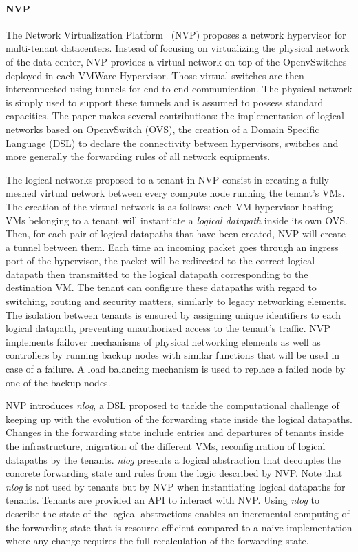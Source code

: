 \paragraph{NVP}
The Network Virtualization Platform~\cite{NVP-Koponen2014} (NVP) proposes a network hypervisor for multi-tenant datacenters. Instead of focusing on virtualizing the physical network of the data center, NVP provides a virtual network on top of the OpenvSwitches~\cite{openvswitch} deployed in each VMWare Hypervisor. Those virtual switches are then interconnected using tunnels for end-to-end communication. 
The physical network is simply used to support these tunnels and is assumed to possess standard capacities.
The paper makes several contributions: the implementation of logical networks based on OpenvSwitch (OVS), the creation of a Domain Specific Language (DSL) to declare the connectivity between hypervisors, switches and more generally the forwarding rules of all network equipments.

The logical networks proposed to a tenant in NVP consist in creating a fully meshed virtual network between every compute node running the tenant's VMs.
The creation of the virtual network is as follows:
each VM hypervisor hosting VMs belonging to a tenant will instantiate a \textit{logical datapath} inside its own OVS. 
Then, for each pair of logical datapaths that have been created, NVP will create a tunnel between them.
Each time an incoming packet goes through an ingress port of the hypervisor, the packet will be redirected to the correct logical datapath then transmitted to the logical datapath corresponding to the destination VM.
The tenant can configure these datapaths with regard to switching, routing and security matters, similarly to legacy networking elements.
The isolation between tenants is ensured by assigning unique identifiers to each logical datapath, preventing unauthorized access to the tenant's traffic.
NVP implements failover mechanisms of physical networking elements as well as controllers by running backup nodes with similar functions that will be used in case of a failure.
A load balancing mechanism is used to replace a failed node by one of the backup nodes.

NVP introduces \textit{nlog}, a DSL proposed to tackle the computational challenge of keeping up with the evolution of the forwarding state inside the logical datapaths. Changes in the forwarding state include entries and departures of tenants inside the infrastructure, migration of the different VMs, reconfiguration of logical datapaths by the tenants. \textit{nlog} presents a logical abstraction that decouples the concrete forwarding state and rules from the logic described by NVP. Note that \textit{nlog} is not used by tenants but by NVP when instantiating logical datapaths for tenants.
Tenants are provided an API to interact with NVP.
Using \textit{nlog} to describe the state of the logical abstractions enables an incremental computing of the forwarding state that is resource efficient compared to a naive implementation where any change requires the full recalculation of the forwarding state.

